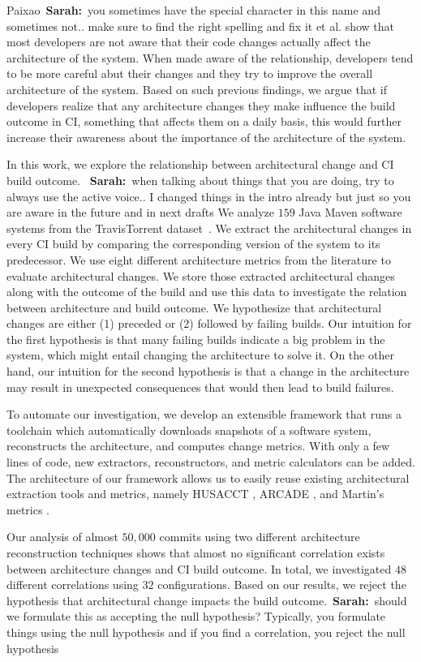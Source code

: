 \documentclass[sigplan, anonymous, review]{acmart}
\newcommand{\sn}[1]{{\color{blue}\textbf{Sarah:}~#1}}
\begin{document}
Paixao~\sn{you sometimes have the special character in this name and sometimes not.. make sure to find the right spelling and fix it} et al. \cite{ImpactAwareness} show that most developers are not aware that their code changes actually affect the architecture of the system. When made aware of the relationship, developers tend to be more careful abut their changes and they try to improve the overall architecture of the system.
Based on such previous findings, we argue that if developers realize that any architecture changes they make influence the build outcome in CI, something that affects them on a daily basis, this would further increase their awareness about the importance of the architecture of the system.

In this work, we explore the relationship between architectural change and CI build outcome.
~\sn{when talking about things that you are doing, try to always use the active voice.. I changed things in the intro already but just so you are aware in the future and in next drafts}
We analyze $159$ Java Maven software systems from the TravisTorrent dataset~\cite{addcitation}. 
We extract the architectural changes in every CI build by comparing the corresponding version of the system to its predecessor.
We use eight different architecture metrics from the literature to evaluate architectural changes.  
We store those extracted architectural changes along with the outcome of the build and use this data to investigate the relation between architecture and build outcome.
We hypothesize that architectural changes are either (1) preceded or (2) followed by failing builds. 
Our intuition for the first hypothesis is that many failing builds indicate a big problem in the system, which might entail changing the architecture to solve it. 
On the other hand, our intuition for the second hypothesis is that a change in the architecture may result in unexpected consequences that would then lead to build failures.

To automate our investigation, we develop an extensible framework that runs a toolchain which automatically downloads snapshots of a software system, reconstructs the architecture, and computes change metrics. With only a few lines of code, new extractors, reconstructors, and metric calculators can be added. 
The architecture of our framework allows us to easily reuse existing architectural extraction tools and metrics, namely HUSACCT \cite{Husacct1}, ARCADE \cite{Arcade}, and Martin's metrics \cite{martinsMetrics}.

Our analysis of almost $50,000$ commits using two different architecture reconstruction techniques shows that almost no significant correlation exists between architecture changes and CI build outcome. In total, we investigated $48$ different correlations using $32$ configurations. Based on our results, we reject the hypothesis that architectural change impacts the build outcome.~\sn{should we formulate this as accepting the null hypothesis? Typically, you formulate things using the null hypothesis and if you find a correlation, you reject the null hypothesis}
\end{document}
